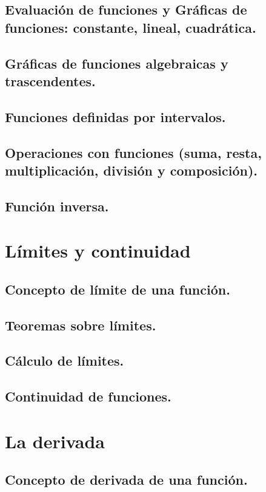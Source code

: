 \subsection{Evaluación de funciones y Gráficas de funciones: constante, lineal, cuadrática.}
\subsection{Gráficas de funciones algebraicas y trascendentes.}
\subsection{Funciones definidas por intervalos.}
\subsection{Operaciones con funciones (suma, resta, multiplicación, división y composición).}
\subsection{Función inversa.}




\section{Límites y continuidad} %
\subsection{Concepto de límite de una función.}
\subsection{Teoremas sobre límites.}
\subsection{Cálculo de límites.}
\subsection{Continuidad de funciones.}






\section{La derivada} %
\subsection{Concepto de derivada de una función.}

